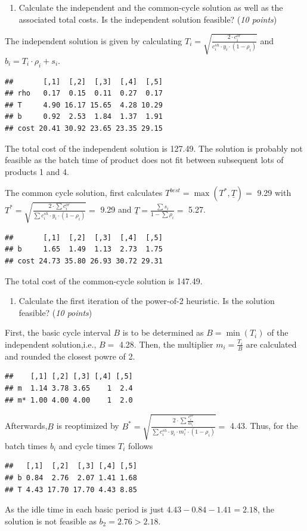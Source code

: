 \documentclass[
]{article}
\providecommand{\tightlist}{%
  \setlength{\itemsep}{0pt}\setlength{\parskip}{0pt}}
\begin{document}
\begin{enumerate}
\def\labelenumi{\arabic{enumi}.}
\tightlist
\item
  Calculate the independent and the common-cycle solution as well as the
  associated total costs. Is the independent solution feasible?
  (\emph{10 points})
\end{enumerate}

The independent solution is given by calculating
\(T_i = \sqrt{\frac{2 \cdot c^{or}_i}{c^{sh}_i \cdot y_i \cdot (1-\rho_i)}}\)
and \(b_i = T_i \cdot \rho_i + s_i\).

\begin{verbatim}
##       [,1]  [,2]  [,3]  [,4]  [,5]
## rho   0.17  0.15  0.11  0.27  0.17
## T     4.90 16.17 15.65  4.28 10.29
## b     0.92  2.53  1.84  1.37  1.91
## cost 20.41 30.92 23.65 23.35 29.15
\end{verbatim}

The total cost of the independent solution is 127.49. The solution is
probably not feasible as the batch time of product does not fit between
subsequent lots of products 1 and 4.

The common cycle solution, first calculates
\(T^{best} = \max(T^*, \underline{T})=\) 9.29 with
\(T^*=\sqrt{\frac{2\cdot \sum c_i^{or}}{\sum c_i^{sh} \cdot y_i \cdot (1-\rho_i)}}=\)
9.29 and \(\underline{T} =\frac{\sum s_i}{1-\sum \rho_i}=\) 5.27.

\begin{verbatim}
##       [,1]  [,2]  [,3]  [,4]  [,5]
## b     1.65  1.49  1.13  2.73  1.75
## cost 24.73 35.80 26.93 30.72 29.31
\end{verbatim}

The total cost of the common-cycle solution is 147.49.

\begin{enumerate}
\def\labelenumi{\arabic{enumi}.}
\setcounter{enumi}{1}
\tightlist
\item
  Calculate the first iteration of the power-of-2 heuristic. Is the
  solution feasible? (\emph{10 points})
\end{enumerate}

First, the basic cycle interval \(B\) is to be determined as
\(B=\min(T_i)\) of the independent solution,i.e., \(B=\) 4.28. Then, the
multiplier \(m_i = \frac{T_i}{B}\) are calculated and rounded the
closest powre of 2.

\begin{verbatim}
##    [,1] [,2] [,3] [,4] [,5]
## m  1.14 3.78 3.65    1  2.4
## m* 1.00 4.00 4.00    1  2.0
\end{verbatim}

Afterwards,\(B\) is reoptimized by
\(B^* = \sqrt{\frac{ 2 \cdot \sum \frac{c_i^{or}}{m_i^*}} {\sum c_i^{sh} \cdot y_i \cdot m_i^* \cdot (1-\rho_i)} } =\)
4.43. Thus, for the batch times \(b_i\) and cycle times \(T_i\) follows

\begin{verbatim}
##   [,1]  [,2]  [,3] [,4] [,5]
## b 0.84  2.76  2.07 1.41 1.68
## T 4.43 17.70 17.70 4.43 8.85
\end{verbatim}

As the idle time in each basic period is just \(4.43-0.84-1.41 = 2.18\),
the solution is not feasible as \(b_2 = 2.76 > 2.18\).
\end{document}
